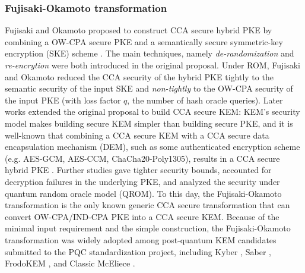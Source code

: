 \documentclass[runningheads]{llncs}
\begin{document}
\subsubsection{Fujisaki-Okamoto transformation}
Fujisaki and Okamoto proposed to construct CCA secure hybrid PKE by combining a OW-CPA secure PKE and a semantically secure symmetric-key encryption (SKE) scheme \cite{DBLP:conf/crypto/FujisakiO99}. The main techniques, namely \textit{de-randomization} and \textit{re-encrytion} were both introduced in the original proposal. Under ROM, Fujisaki and Okamoto reduced the CCA security of the hybrid PKE tightly to the semantic security of the input SKE and \textit{non-tightly} to the OW-CPA security of the input PKE (with loss factor $q$, the number of hash oracle queries). Later works extended the original proposal to build CCA secure KEM: KEM's security model makes building secure KEM simpler than building secure PKE, and it is well-known that combining a CCA secure KEM with a CCA secure data encapsulation mechanism (DEM), such as some authenticated encryption scheme (e.g. AES-GCM, AES-CCM, ChaCha20-Poly1305), results in a CCA secure hybrid PKE \cite{DBLP:journals/iacr/Shoup01,DBLP:conf/eurocrypt/Shoup00a}. Further studies \cite{DBLP:conf/ima/Dent03,DBLP:conf/tcc/HofheinzHK17,DBLP:journals/iacr/BernsteinP18,DBLP:conf/asiacrypt/HovelmannsHM22,DBLP:conf/pqcrypto/XagawaY19,DBLP:conf/crypto/JiangZCWM18} gave tighter security bounds, accounted for decryption failures in the underlying PKE, and analyzed the security under quantum random oracle model (QROM). To this day, the Fujisaki-Okamoto transformation is the only known generic CCA secure transformation that can convert OW-CPA/IND-CPA PKE into a CCA secure KEM. Because of the minimal input requirement and the simple construction, the Fujisaki-Okamoto transformation was widely adopted among post-quantum KEM candidates submitted to the PQC standardization project, including Kyber \cite{DBLP:conf/eurosp/BosDKLLSSSS18}, Saber \cite{DBLP:conf/africacrypt/DAnversKRV18}, FrodoKEM \cite{DBLP:conf/ccs/BosCDMNNRS16}, and Classic McEliece \cite{DBLP:conf/ches/BernsteinCS13,DBLP:conf/ches/Chou17,ClassicMcEliece2022}.
\end{document}
